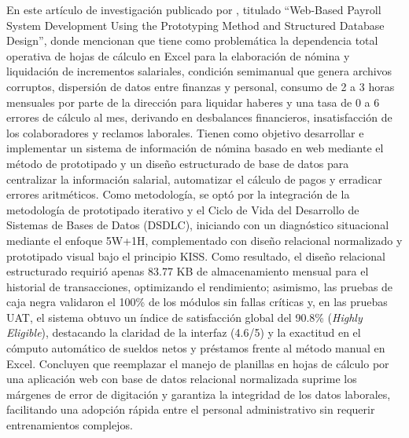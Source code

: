 En este artículo de investigación publicado por \textcite{tandrio2026web}, titulado ``Web-Based Payroll System Development Using the Prototyping Method and Structured Database Design'', 
donde mencionan que tiene como problemática la dependencia total operativa de hojas de cálculo en Excel para la elaboración de nómina y liquidación de incrementos salariales, 
condición semimanual que genera archivos corruptos, dispersión de datos entre finanzas y personal, consumo de 2 a 3 horas mensuales por parte de la dirección para liquidar haberes y 
una tasa de 0 a 6 errores de cálculo al mes, 
derivando en desbalances financieros, insatisfacción de los colaboradores y reclamos laborales. Tienen como objetivo desarrollar e implementar un sistema de 
información de nómina basado en web mediante el método de prototipado y un diseño estructurado de base de datos para centralizar la información salarial, 
automatizar el cálculo de pagos y erradicar errores aritméticos. Como metodología, se optó por la integración de la metodología de prototipado iterativo 
y el Ciclo de Vida del Desarrollo de Sistemas de Bases de Datos (DSDLC), 
iniciando con un diagnóstico situacional mediante el enfoque 5W+1H, complementado con diseño relacional normalizado y prototipado visual bajo el principio KISS. 
Como resultado, el diseño relacional estructurado requirió apenas 83.77 KB de almacenamiento mensual para el historial de transacciones, 
optimizando el rendimiento; asimismo, las pruebas de caja negra validaron el 100\% de los módulos sin fallas críticas y, en las pruebas UAT, 
el sistema obtuvo un índice de satisfacción global del 90.8\% (\textit{Highly Eligible}), destacando la claridad de la interfaz (4.6/5) y 
la exactitud en el cómputo automático de sueldos netos y préstamos frente al método manual en Excel. 
Concluyen que reemplazar el manejo de planillas en hojas de cálculo por una aplicación web con base de datos relacional normalizada
suprime los márgenes de error de digitación y garantiza la integridad de los datos laborales, facilitando una adopción rápida entre el personal administrativo sin requerir entrenamientos complejos.


